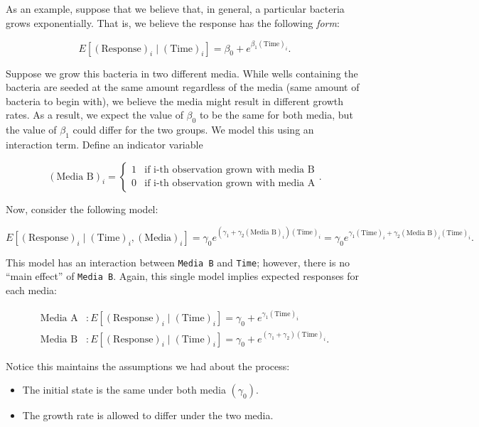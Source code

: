 \documentclass[
]{book}
\providecommand{\tightlist}{%
  \setlength{\itemsep}{0pt}\setlength{\parskip}{0pt}}
\theoremstyle{plain}
\theoremstyle{mydefn}
\theoremstyle{myexmpl}
\theoremstyle{remark}
\begin{document}
As an example, suppose that we believe that, in general, a particular bacteria grows exponentially. That is, we believe the response has the following \emph{form}:

\[E\left[(\text{Response})_i \mid (\text{Time})_i\right] = \beta_0 + e^{\beta_1 (\text{Time})_i}.\]

Suppose we grow this bacteria in two different media. While wells containing the bacteria are seeded at the same amount regardless of the media (same amount of bacteria to begin with), we believe the media might result in different growth rates. As a result, we expect the value of \(\beta_0\) to be the same for both media, but the value of \(\beta_1\) could differ for the two groups. We model this using an interaction term. Define an indicator variable

\[(\text{Media B})_i = \begin{cases} 1 & \text{if i-th observation grown with media B} \\ 0 & \text{if i-th observation grown with media A} \end{cases}.\]

Now, consider the following model:

\[E\left[(\text{Response})_i \mid (\text{Time})_i, (\text{Media})_i\right] = \gamma_0 e^{\left(\gamma_1 + \gamma_{2} (\text{Media B})_i\right) (\text{Time})_i} = \gamma_0 e^{\gamma_1 (\text{Time})_i + \gamma_{2} (\text{Media B})_i (\text{Time})_i}.\]

This model has an interaction between \texttt{Media\ B} and \texttt{Time}; however, there is no ``main effect'' of \texttt{Media\ B}. Again, this single model implies expected responses for each media:

\[
\begin{aligned}
  \text{Media A}&: E\left[(\text{Response})_i \mid (\text{Time})_i\right] = \gamma_0 + e^{\gamma_1 (\text{Time})_i} \\
  \text{Media B}&: E\left[(\text{Response})_i \mid (\text{Time})_i\right] = \gamma_0 + e^{\left(\gamma_1 + \gamma_2\right)(\text{Time})_i}.
\end{aligned}
\]

Notice this maintains the assumptions we had about the process:

\begin{itemize}
\tightlist
\item
  The initial state is the same under both media \(\left(\gamma_0\right)\).
\item
  The growth rate is allowed to differ under the two media.
\end{itemize}
\end{document}

